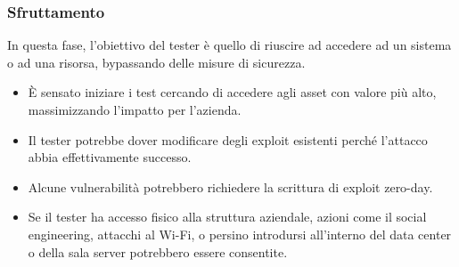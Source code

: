 \documentclass{article}
\begin{document}
\subsubsection{Sfruttamento}
In questa fase, l’obiettivo del tester è quello di riuscire ad accedere ad un 
sistema o ad una risorsa, bypassando delle misure di sicurezza.
\begin{itemize}
    \item È sensato iniziare i test cercando di accedere agli asset con valore più alto, massimizzando l’impatto per l’azienda.
    \item Il tester potrebbe dover modificare degli exploit esistenti perché l’attacco abbia effettivamente successo.
    \item Alcune vulnerabilità potrebbero richiedere la scrittura di exploit zero-day.
    \item Se il tester ha accesso fisico alla struttura aziendale, azioni come il social engineering, attacchi al Wi-Fi, o persino introdursi all’interno del data center o della sala server potrebbero essere consentite.
\end{itemize}
\end{document}
